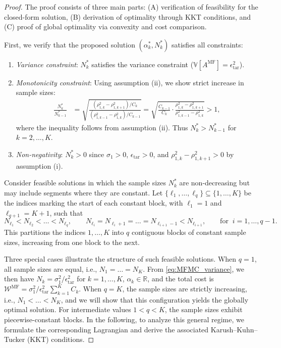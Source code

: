 \begin{proof}
The proof consists of three main parts: (A) verification of feasibility for the closed-form solution, (B) derivation of optimality through KKT conditions, and (C) proof of global optimality via convexity and cost comparison.


First, we verify that the proposed solution $(\alpha_k^*, N_k^*)$ satisfies all constraints:
\begin{enumerate}
    \item \textit{Variance constraint}: $N_k^*$ satisfies the variance constraint ($\mathbb{V}[A^{\text{MF}}] = \epsilon_{\text{tar}}^2$).
    
    \item \textit{Monotonicity constraint}: Using assumption (ii), we show strict increase in sample sizes:
    \begin{align*}
    \frac{N_k^*}{N_{k-1}^*} &= \sqrt{ \frac{(\rho_{1,k}^2 - \rho_{1,k+1}^2)/C_k}{(\rho_{1,k-1}^2 - \rho_{1,k}^2)/C_{k-1}} } = \sqrt{ \frac{C_{k-1}}{C_k} \cdot \frac{\rho_{1,k}^2 - \rho_{1,k+1}^2}{\rho_{1,k-1}^2 - \rho_{1,k}^2} } > 1,
    \end{align*}
    where the inequality follows from assumption (ii). Thus $N_k^* > N_{k-1}^*$ for $k=2,\ldots,K$.
    
    \item \textit{Non-negativity}: $N_k^* > 0$ since $\sigma_1 > 0$, $\epsilon_{\text{tar}} > 0$, and $\rho_{1,k}^2 - \rho_{1,k+1}^2 > 0$ by assumption (i).
\end{enumerate}


Consider feasible solutions in which the sample sizes $N_k^*$ are non-decreasing but may include segments where they are constant. Let $\{\ell_1, \ldots, \ell_q\}\subseteq \{1,\ldots, K\}$ be the indices marking the start of each constant block, with $\ell_1=1$ and $\ell_{q+1} = K+1$, such that
%
\[
N_{\ell_1}<N_{\ell_2}<\ldots < N_{\ell_{q}},\quad\quad  N_{\ell_i}=N_{\ell_i+1}=\ldots = N_{\ell_{i+1}-1} <N_{\ell_{i+1}}, \qquad \text{for}\;\;  i=1,\ldots,q-1.
\]
%
This partitions the indices ${1,\dots,K}$ into $q$ contiguous blocks of constant sample sizes, increasing from one block to the next. 

Three special cases illustrate the structure of such feasible solutions. When $q=1$, all sample sizes are equal, i.e., $N_1=\ldots=N_K$. From \eqref{eq:MFMC_variance}, we then have $N_k=\sigma_1^2/\epsilon_{\text{tar}}^2$ for $k=1,\ldots, K$, $\alpha_k\in \mathbb{R}$, and the total cost is $\mathcal{W}^\text{MF} = \sigma_1^2/\epsilon_{\text{tar}}^2 \sum_{k=1}^K C_k$. When $q=K$, the sample sizes are strictly increasing, i.e., $N_1<\ldots<N_K$,  and we will show that this configuration yields the globally optimal solution. For intermediate values $1<q<K$, the sample sizes exhibit piecewise-constant blocks. In the following, to analyze this general regime, we formulate the corresponding Lagrangian and derive the associated Karush–Kuhn–Tucker (KKT) conditions.




\end{proof}
